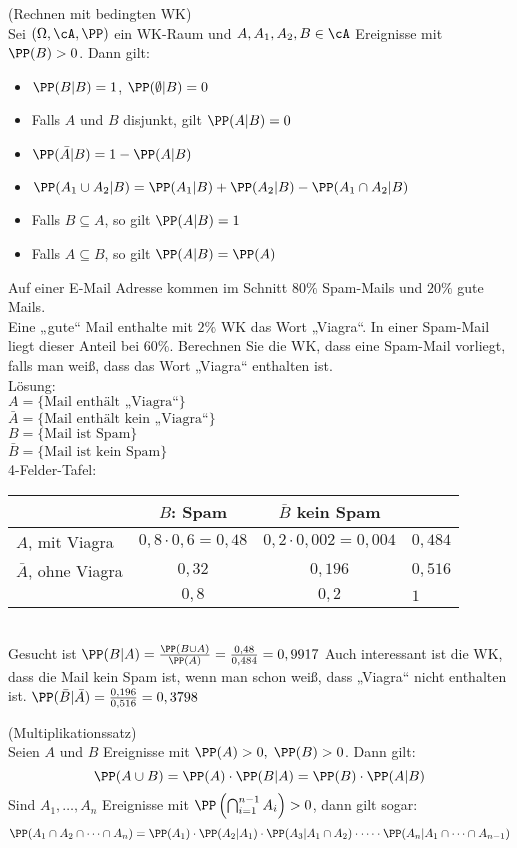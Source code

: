 \documentclass{scrreprt}
\begin{document}
 (Rechnen mit bedingten WK)\\
Sei $(\Omega, \cA, \PP)$ ein WK-Raum und $A, A_1, A_2, B \in \cA$ Ereignisse mit $\PP(B)>0$. Dann gilt:
\begin{itemize}
\item $\PP(B|B)=1$, $\PP(\emptyset|B)=0$
\item Falls $A$ und $B$ disjunkt, gilt $\PP(A|B)=0$
\item $\PP(\bar A | B) = 1-\PP(A|B)$
\item $\PP(A_1 \cup A_2 | B ) =\PP(A_1 | B ) + \PP (A_2|B) - \PP (A_1 \cap A_2 | B)$
\item Falls $B\subseteq A$, so gilt $\PP(A|B)=1$
\item Falls $A \subseteq B$, so gilt $\PP(A|B)=\PP(A)$
\end{itemize}

 Auf einer E-Mail Adresse kommen im Schnitt $80\%$ Spam-Mails und $20\%$ gute Mails.\\
Eine „gute“ Mail enthalte mit $2\%$ WK das Wort „Viagra“. In einer Spam-Mail liegt dieser Anteil bei $60\%$. Berechnen Sie die WK, dass eine Spam-Mail vorliegt, falls man weiß, dass das Wort „Viagra“ enthalten ist.\\
Lösung:\\
$A=\{\text{Mail enthält „Viagra“}\}$\\
$\bar A=\{\text{Mail enthält kein „Viagra“}\}$\\
$B=\{\text{Mail ist Spam}\}$\\
$\bar B=\{\text{Mail ist kein Spam}\}$\\
4-Felder-Tafel:\\
\begin{tabular}{l | c | c | l}
& $B$: Spam & $\bar B$ kein Spam & \\
\hline
$A$, mit Viagra & $0,8\cdot 0,6=0,48$ & $0,2 \cdot 0,002=0,004$ & $0,484$\\
$\bar A$, ohne Viagra & $0,32$ & $0,196$ & $0,516$\\
\hline 
& $0,8$ & $0,2$ & $1$
\end{tabular}\\
Gesucht ist $\PP(B|A)=\frac{\PP(B\cup A)}{\PP(A)}=\frac{0,48}{0,484}=0,9917$
Auch interessant ist die WK, dass die Mail kein Spam ist, wenn man schon weiß, dass „Viagra“ nicht enthalten ist. $\PP(\bar B | \bar A)=\frac{0,196}{0,516}=0,3798$

 (Multiplikationssatz)\\
Seien $A$ und $B$ Ereignisse mit $\PP(A)>0,\; \PP(B)>0$. Dann gilt:
$$\PP(A\cup B ) = \PP(A ) \cdot \PP(B|A) = \PP(B) \cdot \PP(A|B)$$
Sind $A_1,\dots,A_n$ Ereignisse mit $\PP\left( \bigcap_{i=1}^{n-1} A_i\right) >0$, dann gilt sogar:
$$\PP(A_1\cap A_2 \cap \dots \cap A_n)=\PP(A_1)\cdot \PP(A_2|A_1) \cdot \PP (A_3|A_1 \cap A_2)\cdot \dots \cdot \PP(A_n|A_1 \cap \dots \cap A_{n-1})$$
\end{document}
